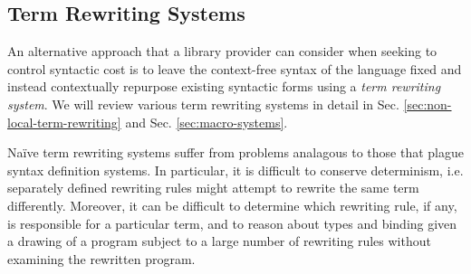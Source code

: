 



\subsection{Term Rewriting Systems}
An alternative approach that a library provider can consider when seeking to control syntactic cost is to leave the context-free syntax of the language fixed and instead contextually repurpose existing syntactic forms using a \emph{term rewriting system}. We will review various term rewriting systems in detail in Sec. \ref{sec:non-local-term-rewriting} and Sec. \ref{sec:macro-systems}. 

Na\"ive term rewriting systems suffer from problems analagous to those that plague syntax definition systems. In particular, it is difficult to conserve determinism, i.e. separately defined rewriting rules might attempt to rewrite the same term differently. Moreover, it can be difficult to determine which rewriting rule, if any, is responsible for a particular term, and to reason about types and binding given a drawing of a program subject to a large number of rewriting rules without examining the rewritten program.

